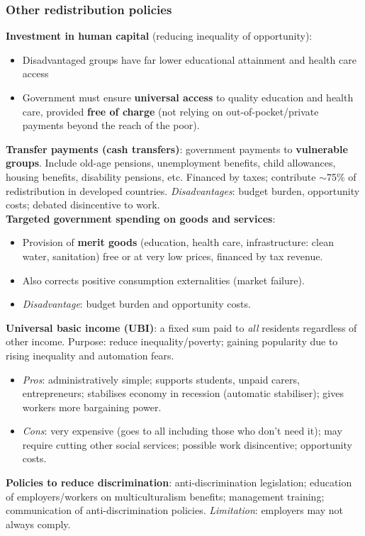 \subsubsection*{Other redistribution policies}
\textbf{Investment in human capital} (reducing inequality of opportunity):
\begin{itemize}
  \item Disadvantaged groups have far lower educational attainment and health care access
  \item Government must ensure \textbf{universal access} to quality education and health care, provided \textbf{free of charge} (not relying on out-of-pocket/private payments beyond the reach of the poor).
\end{itemize}
\textbf{Transfer payments (cash transfers)}: government payments to \textbf{vulnerable groups}. Include old-age pensions, unemployment benefits, child allowances, housing benefits, disability pensions, etc. Financed by taxes; contribute $\sim$75\% of redistribution in developed countries. \textit{Disadvantages}: budget burden, opportunity costs; debated disincentive to work.
\\
\textbf{Targeted government spending on goods and services}:
\begin{itemize}
  \item Provision of \textbf{merit goods} (education, health care, infrastructure: clean water, sanitation) free or at very low prices, financed by tax revenue.
  \item Also corrects positive consumption externalities (market failure).
  \item \textit{Disadvantage}: budget burden and opportunity costs.
\end{itemize}
\textbf{Universal basic income (UBI)}: a fixed sum paid to \textit{all} residents regardless of other income. Purpose: reduce inequality/poverty; gaining popularity due to rising inequality and automation fears.
\begin{itemize}
  \item \textit{Pros}: administratively simple; supports students, unpaid carers, entrepreneurs; stabilises economy in recession (automatic stabiliser); gives workers more bargaining power.
  \item \textit{Cons}: very expensive (goes to all including those who don't need it); may require cutting other social services; possible work disincentive; opportunity costs.
\end{itemize}
\textbf{Policies to reduce discrimination}: anti-discrimination legislation; education of employers/workers on multiculturalism benefits; management training; communication of anti-discrimination policies. \textit{Limitation}: employers may not always comply.
